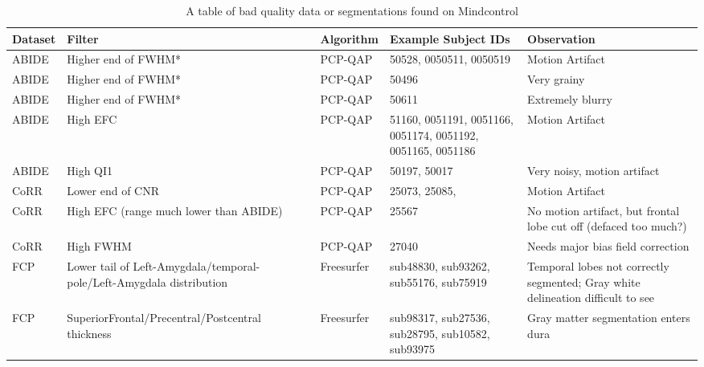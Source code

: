 \begin{table}
\begin{tabular}{ | l | p{3cm} | l | p{3cm} | p{3cm} | }

\hline
	\textbf{Dataset} & \textbf{Filter} & \textbf{Algorithm} & \textbf{Example Subject IDs} & \textbf{Observation} \\ \hline
	ABIDE & Higher end of FWHM* & PCP-QAP & 50528, 0050511, 0050519 & Motion Artifact \\ \hline
	ABIDE & Higher end of FWHM* & PCP-QAP & 50496 & Very grainy \\ \hline
	ABIDE & Higher end of FWHM* & PCP-QAP & 50611 & Extremely blurry \\ \hline
	ABIDE & High EFC & PCP-QAP & 51160, 0051191, 0051166, 0051174, 0051192, 0051165, 0051186 & Motion Artifact \\ \hline
	ABIDE & High QI1 & PCP-QAP & 50197, 50017 & Very noisy, motion artifact \\ \hline
	CoRR & Lower end of CNR & PCP-QAP & 25073, 25085, & Motion Artifact \\ \hline
	CoRR & High EFC (range much lower than ABIDE) & PCP-QAP & 25567 & No motion artifact, but frontal lobe cut off (defaced too much?) \\ \hline
	CoRR & High FWHM & PCP-QAP & 27040 & Needs major bias field correction \\ \hline
	FCP & Lower tail of Left-Amygdala/temporal-pole/Left-Amygdala distribution & Freesurfer & sub48830, sub93262, sub55176, sub75919 & Temporal lobes not correctly segmented; Gray white delineation difficult to see \\ \hline
	FCP & SuperiorFrontal/Precentral/Postcentral thickness & Freesurfer & sub98317, sub27536, sub28795, sub10582, sub93975 & Gray matter segmentation enters dura \\ \hline



\end{tabular}
\label{tab:examples}
\caption{A table of bad quality data or segmentations found on Mindcontrol}

\end{table}
